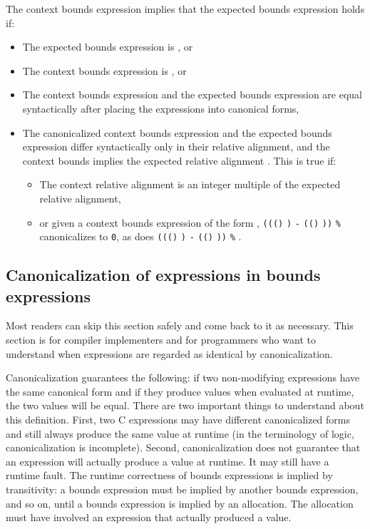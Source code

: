 The context bounds expression implies that the expected bounds
expression holds if:

\begin{itemize}
\item
  The expected bounds expression is \boundsnone, or
\item
  The context bounds expression is \boundsany, or
\item
  The context bounds expression and the expected bounds expression are
  equal syntactically after placing the expressions into canonical
  forms,
\item
  The canonicalized context bounds expression and the expected bounds
  expression differ syntactically only in their relative alignment, and
  the context bounds implies the expected relative alignment .
  This is true if:

  \begin{itemize}
  \item
    The context relative alignment is an integer multiple of the
    expected relative alignment,
  \item
    or given a context bounds expression of the form
    ,
    \texttt{(((\arrayptrchar)}
    \texttt{)} \texttt{-}
    \texttt{((\arrayptrchar)}
    \texttt{))} \texttt{\%}  canonicalizes to
    \texttt{0}, as does
    \texttt{(((\arrayptrchar)}
    \texttt{)} \texttt{-}
    \texttt{((\arrayptrchar)}
    \texttt{))} \texttt{\%} .
  \end{itemize}
\end{itemize}

 \subsection{Canonicalization of expressions in bounds expressions}\label{canonicalization-of-expressions-in-bounds-expressions}


Most readers can skip this section safely and come back to it as
necessary. This section is for compiler implementers and for programmers
who want to understand when expressions are regarded as identical by
canonicalization.

Canonicalization guarantees the following: if two non-modifying
expressions have the same canonical form and if they produce values when
evaluated at runtime, the two values will be equal. There are two
important things to understand about this definition. First, two C
expressions may have different canonicalized forms and still always
produce the same value at runtime (in the terminology of logic,
canonicalization is incomplete). Second, canonicalization does not
guarantee that an expression will actually produce a value at runtime.
It may still have a runtime fault. The runtime correctness of bounds
expressions is implied by transitivity: a bounds expression must be
implied by another bounds expression, and so on, until a bounds
expression is implied by an allocation. The allocation must have
involved an expression that actually produced a value.

